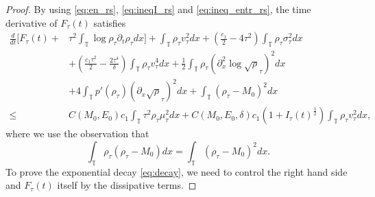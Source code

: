 \documentclass[leqno]{amsart}
\theoremstyle{plain}
\theoremstyle{definition}
\theoremstyle{remark}
\theoremstyle{plain}
\theoremstyle{plain}
\def\T{{\mathbb T}}%
\def\d{{\partial}}
\numberwithin{equation}{section}
\begin{document}
\begin{proof}
By using \eqref{eq:en_rs}, \eqref{eq:ineqI_rs} and \eqref{eq:ineq_entr_rs}, the time derivative of $F_\tau(t)$ satisfies
\begin{equation}\label{eq:dtF_1}
\begin{aligned}
\frac{d}{dt}[F_\tau(t)+&\tau^2\int_\T\log\rho_\tau\d_t\rho_\tau dx]+\int_\T\rho_\tau v^2_\tau dx+\left(\frac{c_1}{2}-4\tau^2\right)\int_\T\rho_\tau\sigma_\tau^2dx\\
&+\left(\frac{c_1\tau^2}{2}-\frac{2\tau^4}{\delta}\right)\int_\T \rho_\tau v_\tau^4 dx+\frac12\int_\T\rho_\tau(\d_x^2\log\sqrt\rho_\tau)^2dx\\
&+4\int_\T p'(\rho_\tau)(\d_x\sqrt\rho_\tau)^2dx+\int_\T(\rho_\tau-M_0)^2dx\\
\leq & C(M_0,E_0)c_1 \int_\T\tau^2\rho_\tau\mu_\tau^2 dx+C(M_0,E_0,\delta)c_1(1+I_\tau(t)^\frac12)\int_\T \rho_\tau v_\tau^2dx,
\end{aligned}
\end{equation}
where we use the observation that
\[
\int_\T\rho_\tau(\rho_\tau-M_0)dx=\int_\T(\rho_\tau-M_0)^2dx.
\]
To prove the exponential decay \eqref{eq:decay}, we need to control the right hand side and $F_\tau(t)$ itself by the dissipative terms.


\end{proof}
\end{document}
